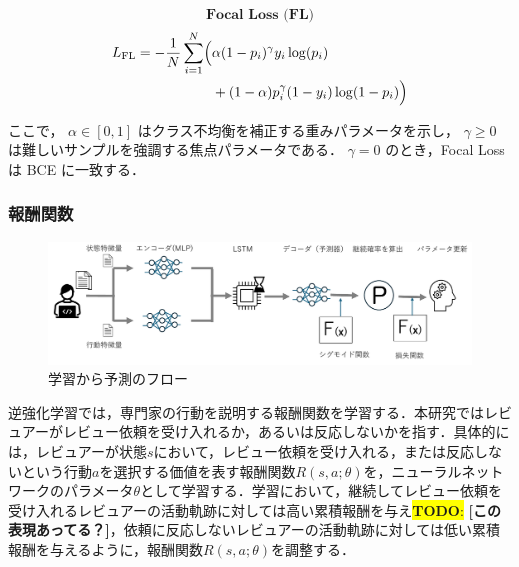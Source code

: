 \documentclass[submit,techrep,noauthor]{ipsj}
\newcommand{\todo}[1]{\colorbox{yellow}{{\bf TODO}:}{\color{red} {\textbf{[#1]}}}}
\begin{document}


\[\textbf{Focal Loss (FL)}\]
\begin{align}
L_{\mathrm{FL}} = - \frac{1}{N} \sum_{i=1}^{N} \Bigl( & \alpha (1 - p_i)^{\gamma} y_i \log(p_i) \nonumber \\
& + (1 - \alpha) p_i^{\gamma} (1 - y_i) \log(1 - p_i) \Bigr) \nonumber 
\end{align}


ここで，
\(\alpha \in [0,1]\) はクラス不均衡を補正する重みパラメータを示し，
\(\gamma \ge 0\) は難しいサンプルを強調する焦点パラメータである．  
\(\gamma = 0\) のとき，Focal Loss は BCE に一致する．


\subsubsection{報酬関数}
\begin{figure}[t]
    \centering
    \includegraphics[width = 1.0\textwidth]{./Hashimoto_fig/prediction.pdf}
    \caption{学習から予測のフロー}
    \label{fig:RL}
\end{figure}



逆強化学習では，専門家の行動を説明する報酬関数を学習する．本研究ではレビュアーがレビュー依頼を受け入れるか，あるいは反応しないかを指す．具体的には，レビュアーが状態$s$において，レビュー依頼を受け入れる，または反応しないという行動$a$を選択する価値を表す報酬関数$R(s, a; \theta)$を，ニューラルネットワークのパラメータ$\theta$として学習する．学習において，継続してレビュー依頼を受け入れるレビュアーの活動軌跡に対しては高い累積報酬を与え\todo{この表現あってる？}，依頼に反応しないレビュアーの活動軌跡に対しては低い累積報酬を与えるように，報酬関数$R(s, a; \theta)$を調整する．
\end{document}
